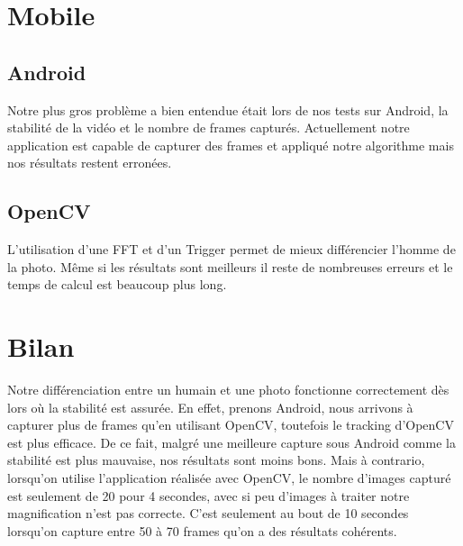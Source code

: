 \section{Mobile}

\subsection{Android}

Notre plus gros problème a bien entendue était lors de nos tests sur Android, la stabilité de la vidéo et le nombre de frames capturés.
Actuellement notre application est capable de capturer des frames et appliqué notre algorithme mais nos résultats restent erronées.

\subsection{OpenCV}
	L'utilisation d'une FFT et d'un Trigger permet de mieux différencier l'homme de la photo. Même si les résultats sont meilleurs il reste de nombreuses erreurs et le temps de calcul est beaucoup plus long.

\section{Bilan}

Notre différenciation entre un humain et une photo fonctionne correctement dès lors où la stabilité est assurée. En effet, prenons Android, nous arrivons
à capturer plus de frames qu'en utilisant OpenCV, toutefois le tracking d'OpenCV est plus efficace. De ce fait, malgré une meilleure capture sous Android 
comme la stabilité est plus mauvaise, nos résultats sont moins bons. Mais à contrario, lorsqu'on utilise l'application réalisée avec OpenCV, le nombre d'images
capturé est seulement de 20 pour 4 secondes, avec si peu d'images à traiter notre magnification n'est pas correcte. C'est seulement au bout de 10 secondes
lorsqu'on capture entre 50 à 70 frames qu'on a des résultats cohérents. 

